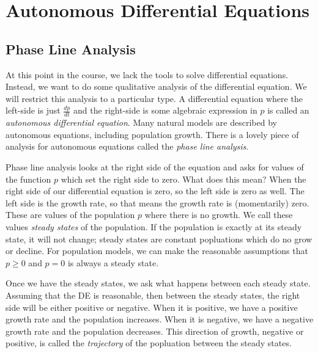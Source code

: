 \documentclass[fleqn]{report}
\begin{document}
\section{Autonomous Differential Equations}
\label{autonomous-des}

\subsection{Phase Line Analysis}
\label{phase-line}

At this point in the course, we lack the tools to solve 
differential equations. Instead, we want to do some
qualitative analysis of the differential equation. We will
restrict this analysis to a particular type. A differential
equation where the left-side is just $\frac{dp}{dt}$ and
the right-side is some algebraic expression in $p$ is
called an \emph{autonomous differential equation}. Many
natural models are described by autonomous equations,
including  population growth. There is a lovely
piece of analysis for autonomous equations called the
\emph{phase line analysis}. 

Phase line analysis looks at the right side of the
equation and asks for values of the function $p$ which set the
right side to zero. What does this mean? When
the right side of our differential equation is zero, so the left
side is zero as well. The left side is the growth rate, so that
means the growth rate is (momentarily) zero. These are values 
of the population $p$ where there is no growth. We call these
values \emph{steady states} of the population. If the
population is exactly at its steady state, it will not change;
steady states are constant popluations which do no grow or
decline. For population models, we can make the reasonable
assumptions that $p \geq 0$ and $p=0$ is always a steady
state.

Once we have the steady states, we ask what happens between
each steady state. Assuming that the DE is reasonable, then
between the steady states, the right side will be either
positive or negative. When it is positive, we have a positive
growth rate and the population increases.  When it is
negative, we have a negative growth rate and the population
decreases. This direction of growth, negative or positive, is
called the \emph{trajectory} of the popluation between the
steady states.
\end{document}
